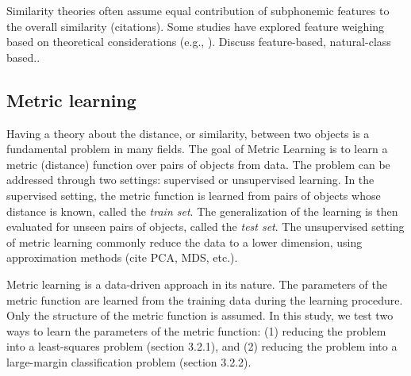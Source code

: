 Similarity theories often assume equal contribution of subphonemic features to the overall similarity (citations). Some studies have explored feature weighing based on theoretical considerations (e.g., \cite{Frisch1997}). Discuss feature-based, natural-class based..

\subsection{Metric learning}
Having a theory about the distance, or similarity, between two objects is a fundamental problem in many fields. The goal of Metric Learning is to learn a metric (distance) function over pairs of objects from data. The problem can be addressed through two settings: supervised or unsupervised learning. In the supervised setting, the metric function is learned from pairs of objects whose distance is known, called the \textit{train set}. The generalization of the learning is then evaluated for unseen pairs of objects, called the \textit{test set}. The unsupervised setting of metric learning commonly reduce the data to a lower dimension, using approximation methods (cite PCA, MDS, etc.).

Metric learning is a data-driven approach in its nature. The parameters of the metric function are learned from the training data during the learning procedure. Only the structure of the metric function is assumed. In this study, we test two ways to learn the parameters of the metric function: (1) reducing the problem into a least-squares problem (section 3.2.1), and (2) reducing the problem into a large-margin classification problem \cite{Chechik2010} (section 3.2.2).

